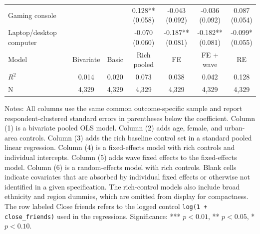 \begin{table}[!htbp]
\begin{tabular}{p{}cccccc}
\\
Gaming console &  &  & \shortstack[c]{0.128** \\[-0.35ex] (0.058)} & \shortstack[c]{-0.043 \\[-0.35ex] (0.092)} & \shortstack[c]{-0.036 \\[-0.35ex] (0.092)} & \shortstack[c]{0.087 \\[-0.35ex] (0.054)}
\\
Laptop/desktop computer &  &  & \shortstack[c]{-0.070 \\[-0.35ex] (0.060)} & \shortstack[c]{-0.187** \\[-0.35ex] (0.081)} & \shortstack[c]{-0.182** \\[-0.35ex] (0.081)} & \shortstack[c]{-0.099* \\[-0.35ex] (0.055)}
\\
\hline
Model & Bivariate & Basic & Rich pooled & FE & FE + wave & RE
\\
$R^2$ & 0.014 & 0.020 & 0.073 & 0.038 & 0.042 & 0.128
\\
N & 4,329 & 4,329 & 4,329 & 4,329 & 4,329 & 4,329
\\
\hline
\end{tabular}
\renewcommand{\arraystretch}{1}
\begin{minipage}{0.97\textwidth}
\footnotesize Notes: All columns use the same common outcome-specific sample and report respondent-clustered standard errors in parentheses below the coefficient. Column (1) is a bivariate pooled OLS model. Column (2) adds age, female, and urban-area controls. Column (3) adds the rich baseline control set in a standard pooled linear regression. Column (4) is a fixed-effects model with rich controls and individual intercepts. Column (5) adds wave fixed effects to the fixed-effects model. Column (6) is a random-effects model with rich controls. Blank cells indicate covariates that are absorbed by individual fixed effects or otherwise not identified in a given specification. The rich-control models also include broad ethnicity and region dummies, which are omitted from display for compactness. The row labeled Close friends refers to the logged control \texttt{log(1 + close\_friends)} used in the regressions. Significance: *** \(p < 0.01\), ** \(p < 0.05\), * \(p < 0.10\).
\end{minipage}
\end{table}
